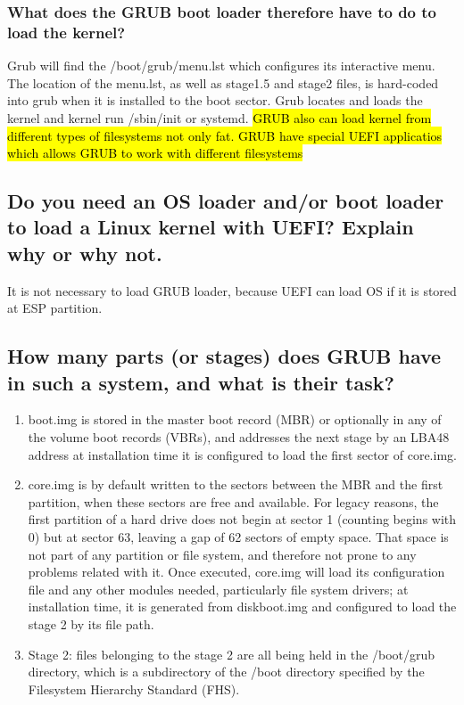 \documentclass[a4paper,11pt]{article}
\theoremstyle{mytheor}
\begin{document}
\subsubsection{What does the GRUB boot loader therefore have to do to load the kernel?}
Grub will find the /boot/grub/menu.lst which configures its interactive menu. The location of the menu.lst, as well as stage1.5 and stage2 files, is hard-coded into grub when it is installed to the boot sector. Grub locates and loads the kernel and kernel run /sbin/init or systemd. \hl{GRUB also can load kernel from different types of filesystems not only fat. GRUB have special UEFI applicatios which allows GRUB to work with different filesystems} 

\subsection{Do you need an OS loader and/or boot loader to load a Linux kernel with UEFI? Explain why or why not.}
It is not necessary to load GRUB loader, because UEFI can load OS if it is stored at ESP partition.

\subsection{How many parts (or stages) does GRUB have in such a system, and what is their task?}
\begin{enumerate}
    \item boot.img is stored in the master boot record (MBR) or optionally in any of the volume boot records (VBRs), and addresses the next stage by an LBA48 address at installation time it is configured to load the first sector of core.img.
    \item core.img is by default written to the sectors between the MBR and the first partition, when these sectors are free and available. For legacy reasons, the first partition of a hard drive does not begin at sector 1 (counting begins with 0) but at sector 63, leaving a gap of 62 sectors of empty space. That space is not part of any partition or file system, and therefore not prone to any problems related with it. Once executed, core.img will load its configuration file and any other modules needed, particularly file system drivers; at installation time, it is generated from diskboot.img and configured to load the stage 2 by its file path.
    \item Stage 2: files belonging to the stage 2 are all being held in the /boot/grub directory, which is a subdirectory of the /boot directory specified by the Filesystem Hierarchy Standard (FHS).
\end{enumerate}
\end{document}
